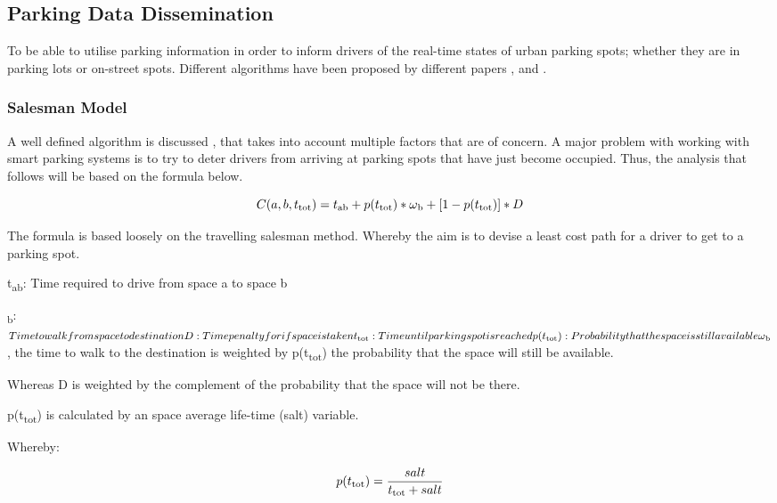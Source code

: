 \subsection{Parking Data Dissemination}
To be able to utilise parking information in order to inform drivers of the real-time states of urban parking spots; whether they are in parking lots or on-street spots. Different algorithms have been proposed by different papers \citep{Schlote2014Delay-tolerantAssignment}, \citep{Verroios2011ReachingNetworking} and \citep{Lin2015SmartService}.

\subsubsection{Salesman Model}
A well defined algorithm is discussed \citep{Verroios2011ReachingNetworking}, that takes into account multiple factors that are of concern. A major problem with working with smart parking systems is to try to deter drivers from arriving at parking spots that have just become occupied. Thus, the analysis that follows will be based on the formula below.

\[ C(a,b,t\textsubscript{tot}) = t\textsubscript{ab} + p(t\textsubscript{tot}) * \omega\textsubscript{b} + [1 - p(t\textsubscript{tot})] * D\]

The formula is based loosely on the travelling salesman method. Whereby the aim is to devise a least cost path for a driver to get to a parking spot.

t\textsubscript{ab}: Time required to drive from space a to space b

\omega\textsubscript{b}: $ Time to walk from space to destination

D: Time penalty for if space is taken

t\textsubscript{tot}: Time until parking spot is reached

p(t\textsubscript{tot}): Probability that the space is still available

\omega\textsubscript{b} $, the time to walk to the destination is weighted by p(t\textsubscript{tot}) the probability that the space will still be available.

Whereas D is weighted by the complement of the probability that the space will not be there.

p(t\textsubscript{tot}) is calculated by an space average life-time (salt) variable. 

Whereby: 

\[ p(t\textsubscript{tot}) = \frac{salt}{t\textsubscript{tot} + salt} \]

